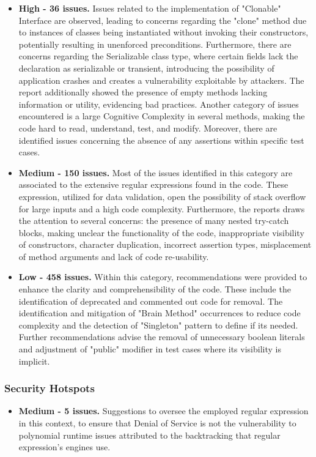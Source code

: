 \documentclass{sigchi}
\begin{document}
\begin{itemize}
    \item \textbf{High - 36 issues.} Issues related to the implementation of "Clonable" Interface are observed, leading to concerns regarding the "clone" method due to instances of classes being instantiated without invoking their constructors, potentially resulting in unenforced preconditions. Furthermore, there are concerns regarding the Serializable class type, where certain fields lack the declaration as serializable or transient, introducing the possibility of application crashes and creates a vulnerability exploitable by attackers. 
    The report additionally showed the presence of empty methods lacking information or utility, evidencing bad practices. Another category of issues encountered is a large Cognitive Complexity in several methods, making the code hard to read, understand, test, and modify. 
    Moreover, there are identified issues concerning the absence of any assertions within specific test cases.
    \item \textbf{Medium - 150 issues.} Most of the issues identified in this category are associated to the extensive regular expressions found in the code. These expression, utilized for data validation, open the possibility of stack overflow for large inputs and a high code complexity. Furthermore, the reports draws the attention to several concerns: the presence of many nested try-catch blocks, making unclear the functionality of the code, inappropriate visibility of constructors, character duplication, incorrect assertion types, misplacement of method arguments and lack of code re-usability. 
    \item \textbf{Low - 458 issues.} Within this category, recommendations were provided to enhance the clarity and comprehensibility of the code. These include the identification of deprecated and commented out code for removal. The identification and mitigation of "Brain Method" occurrences to reduce code complexity and the detection of "Singleton" pattern to define if its needed. Further recommendations advise the removal of unnecessary boolean literals and adjustment of "public" modifier in test cases where its visibility is implicit. 
\end{itemize}

\subsubsection{\textbf{Security Hotspots}}
\begin{itemize}
    \item \textbf{Medium - 5 issues.} Suggestions to oversee the employed regular expression in this context, to ensure that Denial of Service is not the vulnerability to polynomial runtime issues attributed to the backtracking that regular expression's engines use. 
\end{itemize}
\end{document}
